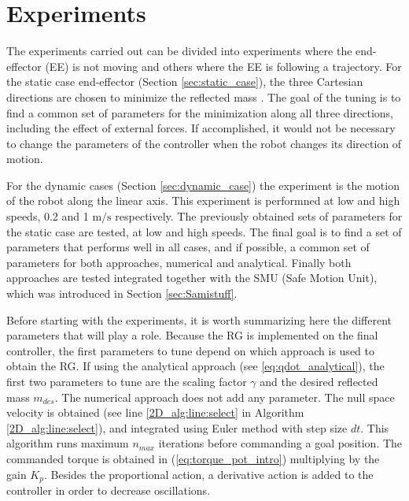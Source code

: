 \chapter{Experiments}
\label{ch:experiments}





The experiments carried out can be divided into experiments where the end-effector (EE) is not moving  and others where the EE is following a trajectory. 
For the static case end-effector (Section \ref{sec:static_case}), the three Cartesian directions are chosen to minimize the reflected mass . The goal of the tuning is to find a common set of parameters for the minimization along all three directions, including the effect of external forces. If accomplished, it would not be necessary to change the parameters of the controller when the robot changes its direction of motion.




For the dynamic cases (Section \ref{sec:dynamic_case}) the  experiment is the motion of the robot along the linear axis. This experiment is performned at low and high speeds, 0.2 and 1 $\mathrm{m/s}$ respectively. 
The previously obtained sets of parameters for the static case are tested, at low and high speeds. The final goal is to find a set of parameters that performs well in all cases, and if possible, a common set of parameters for both approaches, numerical and analytical.
Finally both approaches are tested integrated together with the SMU (Safe Motion Unit), which was introduced in Section \ref{sec:Samistuff}. 

Before starting with the experiments, it is worth summarizing here the different parameters that will play a role. 
Because the RG is implemented on the final controller, the first parameters to tune depend on which approach is used to obtain the RG. If using the analytical approach (see \ref{eq:qdot_analytical}), the first two parameters to tune are the scaling factor $\gamma$ and the desired reflected mass $m_{des}$. The numerical approach does not add any parameter. The null space velocity is obtained (see line \ref{2D_alg:line:select} in Algorithm \ref{2D_alg:line:select}), and integrated using Euler method with step size $dt$. This algorithm runs maximum $n_{max}$ iterations before commanding a goal position. The commanded torque is obtained in (\ref{eq:torque_pot_intro}) multiplying by the gain $K_p$. Besides the proportional action, a derivative action is added to the controller in order to decrease oscillations.



